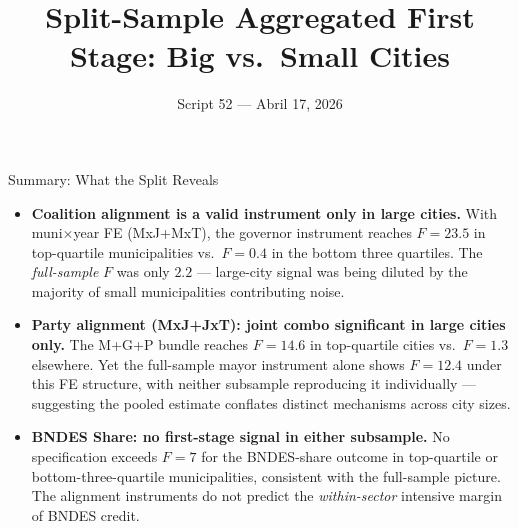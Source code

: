 \documentclass[aspectratio=169,10pt]{beamer}
\title{Split-Sample Aggregated First Stage: Big vs.\ Small Cities}
\subtitle{Script 52 --- Abril 17, 2026}
\author{}
\date{}
\begin{document}
\begin{frame}
\titlepage
\end{frame}


\begin{frame}[t]{Summary: What the Split Reveals}
\begin{itemize}\setlength{\itemsep}{0.9em}
  \item \textbf{Coalition alignment is a valid instrument only in large cities.}
    With muni$\times$year FE (MxJ+MxT), the governor instrument reaches $F=23.5$
    in top-quartile municipalities vs.\ $F=0.4$ in the bottom three quartiles.
    The \emph{full-sample} $F$ was only $2.2$ --- large-city signal was being
    diluted by the majority of small municipalities contributing noise.

  \item \textbf{Party alignment (MxJ+JxT): joint combo significant in large cities
    only.}
    The M+G+P bundle reaches $F=14.6$ in top-quartile cities vs.\ $F=1.3$
    elsewhere.  Yet the full-sample mayor instrument alone shows $F=12.4$ under
    this FE structure, with neither subsample reproducing it individually ---
    suggesting the pooled estimate conflates distinct mechanisms across city sizes.

  \item \textbf{BNDES Share: no first-stage signal in either subsample.}
    No specification exceeds $F=7$ for the BNDES-share outcome in top-quartile
    or bottom-three-quartile municipalities, consistent with the full-sample
    picture.  The alignment instruments do not predict the \emph{within-sector}
    intensive margin of BNDES credit.
\end{itemize}
\end{frame}

\end{document}
